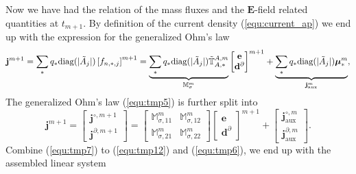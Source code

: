 \documentclass{report}
\begin{document}
Now we have had the relation of the mass fluxes and the $\mathbf{E}$-field related quantities at $t_{m+1}$. By definition of the current density (\ref{equ:current_ap}) we end up with the expression for the generalized Ohm's law 
\begin{equation} \label{equ:tmp5}
    \mathbf{j}^{m+1} = \sum_*q_*\text{diag}(|\Tilde{A}_j|)\left[f_{n,*,j}\right]^{m+1} = \underbrace{\sum_*q_*\text{diag}(|\Tilde{A}_j|) \Tilde{\mathbb{T}}_{A,*}^{A,m}}_{\mathbb{M}_\sigma^m} \begin{bmatrix}
    \mathbf{e} \\
    \mathbf{d}^\partial 
    \end{bmatrix}^{m+1} + \underbrace{\sum_*q_*\text{diag}(|\Tilde{A}_j|) \bm{\mu}^m_*}_{\mathbf{j}^m_\text{aux}},
\end{equation}
The generalized Ohm's law (\ref{equ:tmp5}) is further split into
\begin{equation} \label{equ:tmp6}
    \mathbf{j}^{m+1} =
    \begin{bmatrix}
    \mathbf{j}^{\circ,m+1} \\
    \mathbf{j}^{\partial, m+1}
    \end{bmatrix} =
    \begin{bmatrix}
    \mathbb{M}_{\sigma,11}^m & \mathbb{M}_{\sigma,12}^m \\
    \mathbb{M}_{\sigma,21}^m & \mathbb{M}_{\sigma,22}^m
    \end{bmatrix}
    \begin{bmatrix}
    \mathbf{e} \\
    \mathbf{d}^\partial 
    \end{bmatrix}^{m+1} +
    \begin{bmatrix}
    \mathbf{j}^{\circ, m}_\text{aux} \\
    \mathbf{j}^{\partial,m}_\text{aux}
    \end{bmatrix}.
\end{equation}
Combine (\ref{equ:tmp7}) to (\ref{equ:tmp12}) and (\ref{equ:tmp6}), we end up with the assembled linear system
\end{document}
